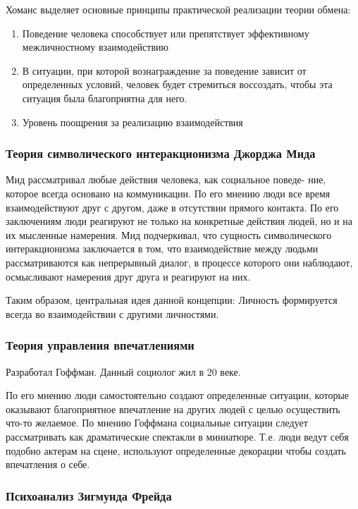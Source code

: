 \documentclass{article}
\begin{document}
Хоманс выделяет основные принципы практической реализации теории
обмена:

\begin{enumerate}
    \item Поведение человека способствует или препятствует эффективному межличностному взаимодействию
    \item В ситуации, при которой вознаграждение за поведение зависит от определенных условий, человек будет стремиться воссоздать, чтобы эта ситуация была благоприятна для него.
    \item Уровень поощрения за реализацию взаимодействия
\end{enumerate}

\subsubsection{Теория символического интеракционизма Джорджа Мида}

Мид рассматривал любые действия человека, как социальное поведе-
ние, которое всегда основано на коммуникации. По его мнению люди все время взаимодействуют друг с другом, даже в отсутствии прямого контакта. По его заключениям люди реагируют не только на конкретные действия людей, но и на их мысленные намерения. Мид подчеркивал, что сущность символического интеракционизма заключается в том, что взаимодействие между людьми рассматриваются как непрерывный диалог, в процессе которого они наблюдают, осмысливают намерения друг друга и реагируют на них.

Таким образом, центральная идея данной концепции: Личность формируется всегда во взаимодействии с другими личностями.

\subsubsection{Теория управления впечатлениями}

Разработал Гоффман. Данный социолог жил в 20 веке.

По его мнению люди самостоятельно создают определенные ситуации,
которые оказывают благоприятное впечатление на других людей с целью осуществить что-то желаемое. По мнению Гоффмана социальные ситуации следует рассматривать как драматические спектакли в миниатюре. Т.е. люди ведут себя подобно актерам на сцене, используют определенные декорации чтобы создать впечатления о себе.

\subsubsection{Психоанализ Зигмунда Фрейда}
\end{document}
